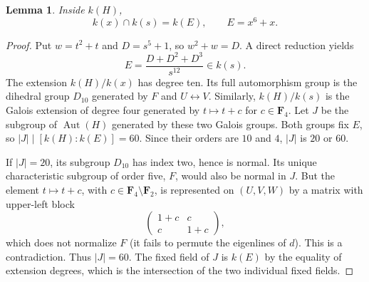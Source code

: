 \documentclass[11pt,a4paper,reqno]{amsart}
\newtheorem{lemma}[theorem]{Lemma}
\newcommand{\FF}{\mathbf F}
\newcommand{\Aut}{\operatorname{Aut}}
\begin{document}
\begin{lemma}\label{lem:int1}
Inside $k(H)$,
\begin{equation}\label{eq:int1}
       k(x)\cap k(s)=k(E),\qquad E=x^6+x.
\end{equation}
\end{lemma}
\begin{proof}
Put $w=t^2+t$ and $D=s^5+1$, so $w^2+w=D$.
A direct reduction yields
\begin{equation}\label{eq:E}
 E=\frac{D+D^2+D^3}{s^{12}}\in k(s).
\end{equation}
The extension $k(H)/k(x)$ has degree ten. Its full automorphism
group is the dihedral group $D_{10}$ generated by $F$ and
$U\leftrightarrow V$. Similarly, $k(H)/k(s)$ is the Galois extension
of degree four generated by $t\mapsto t+c$ for $c\in\FF_4$.
Let $J$ be the subgroup of $\Aut(H)$ generated by these two Galois
groups. Both groups fix $E$, so
$|J|\mid[k(H):k(E)]=60$. Since their orders are $10$ and $4$,
$|J|$ is $20$ or $60$.

If $|J|=20$, its subgroup $D_{10}$ has index two, hence is normal.
Its unique characteristic subgroup of order five, $F$, would also be
normal in $J$. But the element $t\mapsto t+c$, with
$c\in\FF_4\setminus\FF_2$, is represented on $(U,V,W)$ by a matrix
with upper-left block
\[
  \begin{pmatrix}1+c&c\\c&1+c\end{pmatrix},
\]
which does not normalize $F$ (it fails to permute the eigenlines of
$d$). This is a contradiction. Thus $|J|=60$.
The fixed field of $J$ is $k(E)$ by the equality of extension degrees,
which is the intersection of the two individual fixed fields.
\end{proof}
\end{document}
